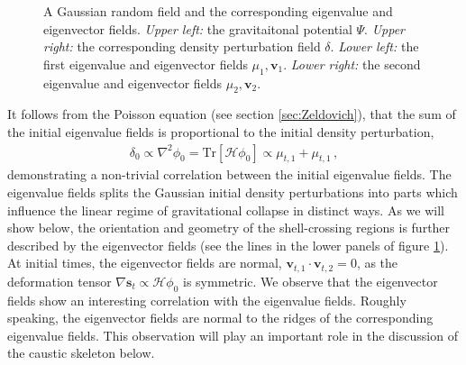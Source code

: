 \documentclass[a4paper, 11pt]{article}
\begin{document}
\begin{figure}
\begin{subfigure}[b]{0.49\textwidth}
\end{subfigure}
\caption{A Gaussian random field and the corresponding eigenvalue and eigenvector fields. \textit{Upper left:} the gravitaitonal potential $\Psi$. \textit{Upper right:} the corresponding density perturbation field $\delta$. \textit{Lower left:} the first eigenvalue and eigenvector fields $\mu_1,\bm{v}_1$. \textit{Lower right:} the second eigenvalue and eigenvector fields $\mu_2,\bm{v}_2$.}\label{fig:Initial_Conditions}
\end{figure}


It follows from the Poisson equation (see section \ref{sec:Zeldovich}), that the sum of the initial eigenvalue fields is proportional to the initial density perturbation, 
\begin{align}
\delta_0 \propto \nabla^2 \phi_0 = \text{Tr}[\mathcal{H}\phi_0] \propto \mu_{t,1} + \mu_{t,1}\,,
\end{align}
demonstrating a non-trivial correlation between the initial eigenvalue fields. The eigenvalue fields splits the Gaussian initial density perturbations into parts which influence the linear regime of gravitational collapse in distinct ways. As we will show below, the orientation and geometry of the shell-crossing regions is further described by the eigenvector fields (see the lines in the lower panels of figure \ref{fig:Initial_Conditions}). At initial times, the eigenvector fields are normal, $\bm{v}_{t,1}\cdot \bm{v}_{t,2}=0$, as the deformation tensor $\nabla \bm{s}_t \propto \mathcal{H} \phi_0$ is symmetric. We observe that the eigenvector fields show an interesting correlation with the eigenvalue fields. Roughly speaking, the eigenvector fields are normal to the ridges of the corresponding eigenvalue fields. This observation will play an important role in the discussion of the caustic skeleton below. 

\end{document}
